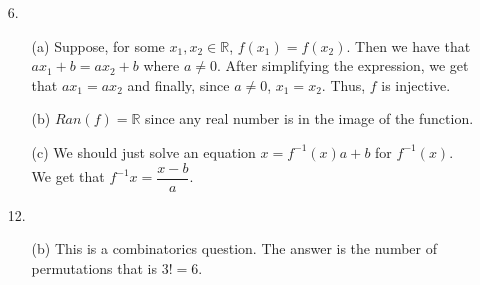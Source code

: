 \documentclass[12pt, a4paper]{article}
\newcommand{\reals}{\mathbb{R}}
\begin{document}
\begin{itemize}
\item[]
\item[]

\item[6.]
\begin{itemize}
\item[(a)]
Suppose, for some $x_1, x_2 \in \reals$, $f(x_1) = f(x_2)$. Then we have that
$ax_1 + b = ax_2 + b$ where $a \neq 0$. After simplifying the expression, we get that $ax_1 = ax_2$
and finally, since $a \neq 0$, $x_1 = x_2$. Thus, $f$ is injective.

\item[]

\item[(b)]
$Ran(f) = \reals$ since any real number is in the image of the function.

\item[]

\item[(c)]
We should just solve an equation $x = f^{-1}(x)a + b$ for $f^{-1}(x)$.\\
We get that $f^{-1}x = \dfrac{x - b}{a}$.
\end{itemize}

\item[]
\item[]

\item[12.]
\begin{itemize}
\item[(b)]
This is a combinatorics question. The answer is the number of permutations that is $3! = 6$.
\end{itemize}

\item[]
\item[]


\end{itemize}
\end{document}
